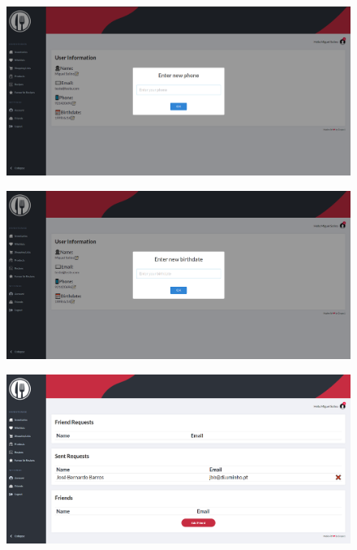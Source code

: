 \documentclass[a4paper]{report}
\begin{document}
    \begin{figure}[H]
        \centering
            \includegraphics[width=\textwidth]{images/produto_final/alterar_numero_perfil.png}
    \end{figure}

    \begin{figure}[H]
        \centering
            \includegraphics[width=\textwidth]{images/produto_final/alterar_nascimento_iventario.png}
    \end{figure}

    \begin{figure}[H]
        \centering
            \includegraphics[width=\textwidth]{images/produto_final/pedido_amigos_enviado.png}
    \end{figure}
\end{document}
